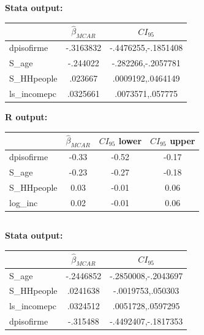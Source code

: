 \documentclass[12pt]{article}
\begin{document}
\subsubsection{}

\textbf{Stata output:}\\


\begin{tabular}{lcc}
\hline
&           $\hat \beta_{MCAR}$&     $CI_{95}$\\
\hline
dpisofirme  &   -.3163832&-.4476255,-.1851408\\
S\_age       &    -.244022&-.282266,-.2057781\\
S\_HHpeople  &     .023667&.0009192,.0464149\\
ls\_incomepc &    .0325661&.0073571,.057775\\
\end{tabular}

\vspace{1cm}
\textbf{R output:}\\

\begin{tabular}{lccc}
\hline
 & $\hat \beta_{MCAR}$  & $CI_{95}$ lower & $CI_{95}$ upper \\
  \hline
dpisofirme & -0.33 &  -0.52 & -0.17 \\
  S\_age & -0.23 &  -0.27 & -0.18 \\
  S\_HHpeople & 0.03 & -0.01 & 0.06 \\
  log\_inc & 0.02 &  -0.01 & 0.06 \\
   \hline
\end{tabular}

\subsection{}

\subsubsection{}
\subsubsection{}

\subsubsection{}
\textbf{Stata output:}\\

\begin{tabular}{lcc}
\hline
&           $\hat \beta_{MCAR}$ &     $CI_{95}$\\
\hline
S\_age       &   -.2446852 &-.2850008,-.2043697\\
S\_HHpeople  &    .0241638 &-.0019753,.050303\\
ls\_incomepc &    .0324512 &.0051728,.0597295\\
dpisofirme  &    -.315488 &-.4492407,-.1817353\\
\hline
\end{tabular}
\end{document}
